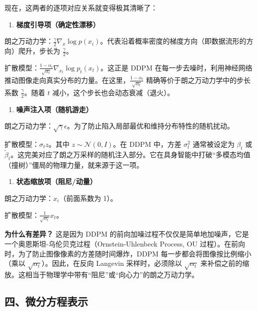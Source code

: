 现在，这两者的逐项对应关系就变得极其清晰了：

\begin{enumerate}
\def\labelenumi{\arabic{enumi}.}
\tightlist
\item
  \textbf{梯度引导项（确定性漂移）}
\end{enumerate}

朗之万动力学：\(\frac{\gamma}{2}\nabla_x\log p(x_i)\)。代表沿着概率密度的梯度方向（即数据流形的方向）爬升，步长为 \(\frac{\gamma}{2}\)。

扩散模型：\(\frac{1-\alpha_t}{\sqrt{\alpha_t}}\nabla_{x_t}\log p_t(x_t)\)。这正是 DDPM 在每一步去噪时，利用神经网络推动图像走向真实分布的力量。在这里，\(\frac{1-\alpha_t}{\sqrt{\alpha_t}}\) 精确等价于朗之万动力学中的步长系数 \(\frac{\gamma}{2}\)。随着 \(t\) 减小，这个步长也会动态衰减（退火）。

\begin{enumerate}
\def\labelenumi{\arabic{enumi}.}
\setcounter{enumi}{1}
\tightlist
\item
  \textbf{噪声注入项（随机游走）}
\end{enumerate}

朗之万动力学：\(\sqrt{\gamma}\epsilon\)。为了防止陷入局部最优和维持分布特性的随机扰动。

扩散模型：\(\sigma_t z\)。其中 \(z\sim\mathcal{N}(0,I)\)。在 DDPM 中，方差 \(\sigma_t^2\) 通常被设定为 \(\beta_t\) 或 \(\tilde{\beta}_t\)。这完美对应了朗之万采样的随机注入部分。它在具身智能中打破``多模态均值（撞树）''僵局的物理力量，就来源于这一项。

\begin{enumerate}
\def\labelenumi{\arabic{enumi}.}
\setcounter{enumi}{2}
\tightlist
\item
  \textbf{状态缩放项（阻尼/动量）}
\end{enumerate}

朗之万动力学：\(x_i\)（前面系数为 1）。

扩散模型：\(\frac{1}{\sqrt{\alpha_t}}x_t\)。

\textbf{为什么有差异？} 这是因为 DDPM 的前向加噪过程不仅仅是简单地加噪声，它是一个奥恩斯坦-乌伦贝克过程（Ornstein-Uhlenbeck Process, OU 过程）。在前向时，为了防止图像像素的方差随时间爆炸，DDPM 每一步都会将图像按比例缩小（乘以 \(\sqrt{\alpha_t}\)）。因此，在反向 Langevin 采样时，必须除以 \(\sqrt{\alpha_t}\) 来补偿之前的缩放。这相当于物理学中带有``阻尼''或``向心力''的朗之万动力学。

\hypertarget{ux56dbux5faeux5206ux65b9ux7a0bux8868ux793a}{%
\subsection{四、微分方程表示}\label{ux56dbux5faeux5206ux65b9ux7a0bux8868ux793a}}

